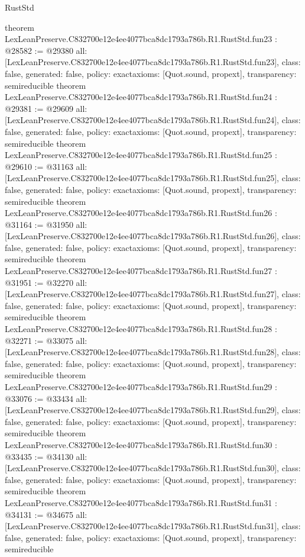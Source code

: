 \begin{lexlean}{RustStd}
\begin{coremodule}
{}
theorem LexLeanPreserve.C832700e12e4ee4077bca8dc1793a786b.R1.RustStd.fun23 : @28582 := @29380 {
  all: [LexLeanPreserve.C832700e12e4ee4077bca8dc1793a786b.R1.RustStd.fun23],
  class: false,
  generated: false,
  policy: exact{axioms: [Quot.sound, propext]},
  transparency: semireducible
}
theorem LexLeanPreserve.C832700e12e4ee4077bca8dc1793a786b.R1.RustStd.fun24 : @29381 := @29609 {
  all: [LexLeanPreserve.C832700e12e4ee4077bca8dc1793a786b.R1.RustStd.fun24],
  class: false,
  generated: false,
  policy: exact{axioms: [Quot.sound, propext]},
  transparency: semireducible
}
theorem LexLeanPreserve.C832700e12e4ee4077bca8dc1793a786b.R1.RustStd.fun25 : @29610 := @31163 {
  all: [LexLeanPreserve.C832700e12e4ee4077bca8dc1793a786b.R1.RustStd.fun25],
  class: false,
  generated: false,
  policy: exact{axioms: [Quot.sound, propext]},
  transparency: semireducible
}
theorem LexLeanPreserve.C832700e12e4ee4077bca8dc1793a786b.R1.RustStd.fun26 : @31164 := @31950 {
  all: [LexLeanPreserve.C832700e12e4ee4077bca8dc1793a786b.R1.RustStd.fun26],
  class: false,
  generated: false,
  policy: exact{axioms: [Quot.sound, propext]},
  transparency: semireducible
}
theorem LexLeanPreserve.C832700e12e4ee4077bca8dc1793a786b.R1.RustStd.fun27 : @31951 := @32270 {
  all: [LexLeanPreserve.C832700e12e4ee4077bca8dc1793a786b.R1.RustStd.fun27],
  class: false,
  generated: false,
  policy: exact{axioms: [Quot.sound, propext]},
  transparency: semireducible
}
theorem LexLeanPreserve.C832700e12e4ee4077bca8dc1793a786b.R1.RustStd.fun28 : @32271 := @33075 {
  all: [LexLeanPreserve.C832700e12e4ee4077bca8dc1793a786b.R1.RustStd.fun28],
  class: false,
  generated: false,
  policy: exact{axioms: [Quot.sound, propext]},
  transparency: semireducible
}
theorem LexLeanPreserve.C832700e12e4ee4077bca8dc1793a786b.R1.RustStd.fun29 : @33076 := @33434 {
  all: [LexLeanPreserve.C832700e12e4ee4077bca8dc1793a786b.R1.RustStd.fun29],
  class: false,
  generated: false,
  policy: exact{axioms: [Quot.sound, propext]},
  transparency: semireducible
}
theorem LexLeanPreserve.C832700e12e4ee4077bca8dc1793a786b.R1.RustStd.fun30 : @33435 := @34130 {
  all: [LexLeanPreserve.C832700e12e4ee4077bca8dc1793a786b.R1.RustStd.fun30],
  class: false,
  generated: false,
  policy: exact{axioms: [Quot.sound, propext]},
  transparency: semireducible
}
theorem LexLeanPreserve.C832700e12e4ee4077bca8dc1793a786b.R1.RustStd.fun31 : @34131 := @34675 {
  all: [LexLeanPreserve.C832700e12e4ee4077bca8dc1793a786b.R1.RustStd.fun31],
  class: false,
  generated: false,
  policy: exact{axioms: [Quot.sound, propext]},
  transparency: semireducible
}
\end{coremodule}
\end{lexlean}
